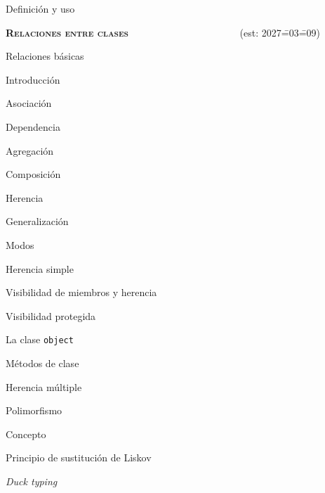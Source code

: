 \begin{longenum}
\begin{longenum}
        \begin{longenum}
            \item Definición y uso
        \end{longenum}
    \end{longenum}
    \item \textbf{\textsc{Relaciones entre clases}} \ \ \ \ \ \ \ \ \ \ \ \ \ \ \ \ \ \ \ \ \ \ (est: 2027\==03\==09)
    \begin{longenum}
        \item Relaciones básicas
        \begin{longenum}
            \item Introducción
            \item Asociación
            \item Dependencia
            \item Agregación
            \item Composición
        \end{longenum}
        \item Herencia
        \begin{longenum}
            \item Generalización
            \item Modos
            \begin{longenum}
                \item Herencia simple
                \item Visibilidad de miembros y herencia
                \begin{longenum}
                    \item Visibilidad protegida
                \end{longenum}
                \item La clase \texttt{object}
                \item Métodos de clase
                \item Herencia múltiple
            \end{longenum}
        \end{longenum}
        \item Polimorfismo
        \begin{longenum}
            \item Concepto
            \item Principio de sustitución de Liskov
            \item \textit{Duck typing}

\end{longenum}
\end{longenum}
\end{longenum}
